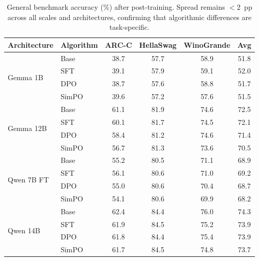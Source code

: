 \documentclass{article}
\begin{document}
\begin{table}[ht]
\centering
\caption{General benchmark accuracy (\%) after post-training. Spread remains $<$2~pp across all scales and architectures, confirming that algorithmic differences are task-specific.}
\label{tab:general_benchmarks}
\small
\begin{tabular}{@{}llcccc@{}}
\toprule
\textbf{Architecture} & \textbf{Algorithm} & \textbf{ARC-C} & \textbf{HellaSwag} & \textbf{WinoGrande} & \textbf{Avg} \\
\midrule
\multirow{4}{*}{Gemma 1B} & Base & 38.7 & 57.7 & 58.9 & 51.8 \\
& SFT & 39.1 & 57.9 & 59.1 & 52.0 \\
& DPO & 38.7 & 57.6 & 58.8 & 51.7 \\
& SimPO & 39.6 & 57.2 & 57.6 & 51.5 \\
\midrule
\multirow{4}{*}{Gemma 12B} & Base & 61.1 & 81.9 & 74.6 & 72.5 \\
& SFT & 60.1 & 81.7 & 74.5 & 72.1 \\
& DPO & 58.4 & 81.2 & 74.6 & 71.4 \\
& SimPO & 56.7 & 81.3 & 73.6 & 70.5 \\
\midrule
\multirow{4}{*}{Qwen 7B FT} & Base & 55.2 & 80.5 & 71.1 & 68.9 \\
& SFT & 56.1 & 80.6 & 71.0 & 69.2 \\
& DPO & 55.0 & 80.6 & 70.4 & 68.7 \\
& SimPO & 54.1 & 80.6 & 69.9 & 68.2 \\
\midrule
\multirow{4}{*}{Qwen 14B} & Base & 62.4 & 84.4 & 76.0 & 74.3 \\
& SFT & 61.9 & 84.5 & 75.2 & 73.9 \\
& DPO & 61.8 & 84.4 & 75.4 & 73.9 \\
& SimPO & 61.7 & 84.5 & 74.8 & 73.7 \\
\bottomrule
\end{tabular}
\end{table}
\end{document}
